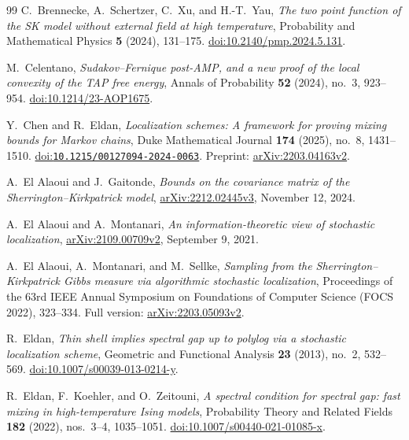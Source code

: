 \begin{thebibliography}{99}
C.~Brennecke, A.~Schertzer, C.~Xu, and H.-T.~Yau,
\emph{The two point function of the SK model without external field at
high temperature}, Probability and Mathematical Physics
\textbf{5} (2024), 131--175.
\href{https://doi.org/10.2140/pmp.2024.5.131}{doi:10.2140/pmp.2024.5.131}.

M.~Celentano,
\emph{Sudakov--Fernique post-AMP, and a new proof of the local convexity of
the TAP free energy}, Annals of Probability \textbf{52} (2024), no.~3,
923--954.
\href{https://doi.org/10.1214/23-AOP1675}{doi:10.1214/23-AOP1675}.

Y.~Chen and R.~Eldan,
\emph{Localization schemes: A framework for proving mixing bounds for
Markov chains}, Duke Mathematical Journal \textbf{174} (2025), no.~8,
1431--1510.
\href{https://doi.org/10.1215/00127094-2024-0063}{doi:\nolinkurl{10.1215/00127094-2024-0063}}.
Preprint: \href{https://arxiv.org/abs/2203.04163v2}{arXiv:2203.04163v2}.

A.~El Alaoui and J.~Gaitonde,
\emph{Bounds on the covariance matrix of the Sherrington--Kirkpatrick model},
\href{https://arxiv.org/abs/2212.02445v3}{arXiv:2212.02445v3},
November 12, 2024.

A.~El Alaoui and A.~Montanari,
\emph{An information-theoretic view of stochastic localization},
\href{https://arxiv.org/abs/2109.00709v2}{arXiv:2109.00709v2}, September 9, 2021.

A.~El Alaoui, A.~Montanari, and M.~Sellke,
\emph{Sampling from the Sherrington--Kirkpatrick Gibbs measure via
algorithmic stochastic localization},
Proceedings of the 63rd IEEE Annual Symposium on Foundations of
Computer Science (FOCS 2022), 323--334.
Full version: \href{https://arxiv.org/abs/2203.05093v2}{arXiv:2203.05093v2}.

R.~Eldan,
\emph{Thin shell implies spectral gap up to polylog via a stochastic
localization scheme}, Geometric and Functional Analysis \textbf{23}
(2013), no.~2, 532--569.
\href{https://doi.org/10.1007/s00039-013-0214-y}{doi:10.1007/s00039-013-0214-y}.

R.~Eldan, F.~Koehler, and O.~Zeitouni,
\emph{A spectral condition for spectral gap: fast mixing in high-temperature
Ising models}, Probability Theory and Related Fields \textbf{182}
(2022), nos.~3--4, 1035--1051.
\href{https://doi.org/10.1007/s00440-021-01085-x}{doi:10.1007/s00440-021-01085-x}.


\end{thebibliography}
